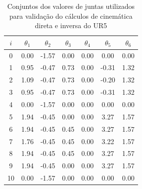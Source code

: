 \begin{table}[htp!]
	\centering
	\caption{Conjuntos dos valores de juntas utilizados para validação do cálculos de cinemática direta e 
		inversa do UR5
	}
	\label{tab:conjuntos-de-valores-de-juntas}
	\begin{tabular}{c|c|c|c|c|c|c}
		\hline
		\rowcolor{white} 					$i$ & $\theta_{1} $ & $\theta_{2}$ & $\theta_{3}$ & $\theta_{4}$ & $\theta_{5}$ & $\theta_{6}$ \\ 
		\hline 
		\rowcolor{home-gray} 				0   &    0.00       &     -1.57    &     0.00     &     0.00     &     0.00     &     0.00     \\ 
		\hline                 
		\rowcolor{pre-post-grasping-gray} 	1   &    0.95       &     -0.47    &     0.73     &     0.00     &    -0.31     &     1.32     \\ 
		\hline                 
		\rowcolor{grasping-gray} 			2   &    1.09       &     -0.47    &     0.73     &     0.00     &    -0.20     &     1.32     \\ 
		\hline                 
		\rowcolor{pre-post-grasping-gray} 	3   &    0.95       &     -0.47    &     0.73     &     0.00     &    -0.31     &     1.32     \\ 
		\hline                 
		\rowcolor{home-gray} 				4   &    0.00       &     -1.57    &     0.00     &     0.00     &     0.00     &     0.00     \\ 
		\hline                 
		\rowcolor{pre-post-grasping-gray} 	5   &    1.94       &     -0.45    &     0.00     &     0.00     &     3.27     &     1.57     \\ 
		\hline                 
		\rowcolor{pre-post-grasping-gray} 	6   &    1.94       &     -0.45    &     0.45     &     0.00     &     3.27     &     1.57     \\ 
		\hline                 
		\rowcolor{grasping-gray} 			7   &    1.76       &     -0.45    &     0.45     &     0.00     &     3.22     &     1.57     \\ 
		\hline                 
		\rowcolor{pre-post-grasping-gray} 	8   &    1.94       &     -0.45    &     0.45     &     0.00     &     3.27     &     1.57     \\ 
		\hline                 
		\rowcolor{pre-post-grasping-gray} 	9   &    1.94       &     -0.45    &     0.00     &     0.00     &     3.27     &     1.57     \\ 
		\hline 
		\rowcolor{home-gray} 				10  &    0.00       &     -1.57    &     0.00     &     0.00     &     0.00     &     0.00     \\ 

\end{tabular}
\end{table}
